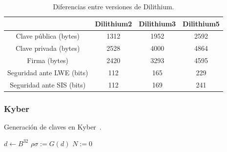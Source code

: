 \begin{table}[H]
    \centering
    \begin{tabular}{|c|c|c|c|}
    \hline
                            & \textbf{Dilithium2}   & \textbf{Dilithium3}   & \textbf{Dilithium5}   \\ \hline
    Clave pública (bytes)   & 1312                  & 1952                  & 2592                  \\ \hline
    Clave privada (bytes)   & 2528                  & 4000                  & 4864                  \\ \hline
    Firma (bytes)           & 2420                  & 3293                  & 4595                  \\ \hline
    Seguridad ante LWE (bits) & 112                 & 165                   & 229                   \\ \hline
    Seguridad ante SIS (bits) & 112                 & 169                   & 241                   \\ \hline
    \end{tabular}
    \caption{Diferencias entre versiones de Dilithium.}
    \label{tab:dilithium}
\end{table}



\subsubsection{Kyber}\label{subsubsec:kyber}


\begin{algorithm}
    \caption{Generación de claves en Kyber~\cite{kyber_spec}.}
    \label{alg:gen_kyber}
    \hspace{2mm}$d \gets B^{32}$\newline
    $\rho\sigma := G(d)$\newline
    $N := 0$\newline
\end{algorithm}


